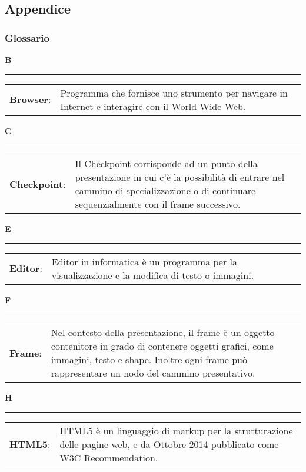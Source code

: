 \newpage
\subsection{Appendice}

\subsubsection{Glossario}
\hfill\Huge{\textbf{B}}\\
\rule{16cm}{.6pt}
\normalsize
	\begin{longtable}{p{} p{}} 
	    \\
		    \textbf{Browser}: &	Programma che fornisce uno strumento per navigare in Internet e interagire con il World Wide Web.\\
	\end{longtable}
	
\hfill\Huge{\textbf{C}}\\
\rule{16cm}{.6pt}
\normalsize
	\begin{longtable}{p{} p{}} 
	    \\
		    \textbf{Checkpoint}: &	Il Checkpoint corrisponde ad un punto della presentazione in cui c'è la possibilità di entrare nel cammino di specializzazione o di continuare sequenzialmente con il frame successivo.\\
	\end{longtable}
	
	\hfill\Huge{\textbf{E}}\\
\rule{16cm}{.6pt}
\normalsize
	\begin{longtable}{p{} p{}} 
	    \\
		    \textbf{Editor}: & Editor in informatica è un programma per la visualizzazione e la modifica di testo o immagini.\\
	\end{longtable}
	
	\hfill\Huge{\textbf{F}}\\
\rule{16cm}{.6pt}
\normalsize
	\begin{longtable}{p{} p{}} 
	    \\
		    \textbf{Frame}: & Nel contesto della presentazione, il frame è un oggetto contenitore in grado di contenere oggetti grafici, come immagini, testo e shape. Inoltre ogni frame può rappresentare un nodo del cammino presentativo.
	\end{longtable}
	
	\hfill\Huge{\textbf{H}}\\
\rule{16cm}{.6pt}
\normalsize
	\begin{longtable}{p{} p{}} 
	    \\
		    \textbf{HTML5}: & HTML5 è un linguaggio di markup per la strutturazione delle pagine web, e da Ottobre 2014 pubblicato come W3C Recommendation.
	\end{longtable}
	
